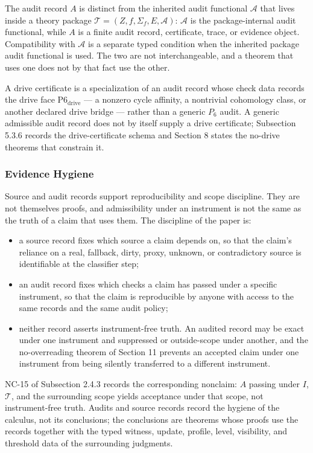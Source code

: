 \documentclass[11pt]{article}
\providecommand{\tightlist}{}
\theoremstyle{definition}
\begin{document}
The audit record \(A\) is distinct from the inherited audit functional \(\mathcal A\) that lives inside a theory package \(\mathcal T=(Z,f,\Sigma_f,E,\mathcal A)\): \(\mathcal A\) is the package-internal audit functional, while \(A\) is a finite audit record, certificate, trace, or evidence object. Compatibility with \(\mathcal A\) is a separate typed condition when the inherited package audit functional is used. The two are not interchangeable, and a theorem that uses one does not by that fact use the other.

A drive certificate is a specialization of an audit record whose check data records the drive face \(\mathrm{P6}_{\mathrm{drive}}\) --- a nonzero cycle affinity, a nontrivial cohomology class, or another declared drive bridge --- rather than a generic \(P_6\) audit. A generic admissible audit record does not by itself supply a drive certificate; Subsection 5.3.6 records the drive-certificate schema and Section 8 states the no-drive theorems that constrain it.

\subsubsection{Evidence Hygiene}

Source and audit records support reproducibility and scope discipline. They are not themselves proofs, and admissibility under an instrument is not the same as the truth of a claim that uses them. The discipline of the paper is:

\begin{itemize}
\tightlist
\item
  a source record fixes which source a claim depends on, so that the claim's reliance on a real, fallback, dirty, proxy, unknown, or contradictory source is identifiable at the classifier step;
\item
  an audit record fixes which checks a claim has passed under a specific instrument, so that the claim is reproducible by anyone with access to the same records and the same audit policy;
\item
  neither record asserts instrument-free truth. An audited record may be exact under one instrument and suppressed or outside-scope under another, and the no-overreading theorem of Section 11 prevents an accepted claim under one instrument from being silently transferred to a different instrument.
\end{itemize}

NC-15 of Subsection 2.4.3 records the corresponding nonclaim: \(A\) passing under \(I\), \(\mathcal T\), and the surrounding scope yields acceptance under that scope, not instrument-free truth. Audits and source records record the hygiene of the calculus, not its conclusions; the conclusions are theorems whose proofs use the records together with the typed witness, update, profile, level, visibility, and threshold data of the surrounding judgments.
\end{document}
